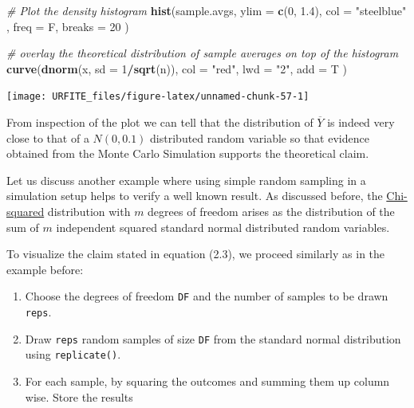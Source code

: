\documentclass[]{book}
\newenvironment{Shaded}{\begin{snugshade}}{\end{snugshade}}
\newcommand{\KeywordTok}[1]{\textcolor[rgb]{0.13,0.29,0.53}{\textbf{#1}}}
\newcommand{\DataTypeTok}[1]{\textcolor[rgb]{0.13,0.29,0.53}{#1}}
\newcommand{\DecValTok}[1]{\textcolor[rgb]{0.00,0.00,0.81}{#1}}
\newcommand{\FloatTok}[1]{\textcolor[rgb]{0.00,0.00,0.81}{#1}}
\newcommand{\StringTok}[1]{\textcolor[rgb]{0.31,0.60,0.02}{#1}}
\newcommand{\CommentTok}[1]{\textcolor[rgb]{0.56,0.35,0.01}{\textit{#1}}}
\newcommand{\OperatorTok}[1]{\textcolor[rgb]{0.81,0.36,0.00}{\textbf{#1}}}
\newcommand{\NormalTok}[1]{#1}
\providecommand{\tightlist}{%
  \setlength{\itemsep}{0pt}\setlength{\parskip}{0pt}}
\theoremstyle{definition}
\theoremstyle{definition}
\theoremstyle{definition}
\theoremstyle{remark}
\begin{document}
\begin{Shaded}
\begin{Highlighting}[]
\CommentTok{# Plot the density histogram}
\KeywordTok{hist}\NormalTok{(sample.avgs, }
     \DataTypeTok{ylim =} \KeywordTok{c}\NormalTok{(}\DecValTok{0}\NormalTok{, }\FloatTok{1.4}\NormalTok{), }
     \DataTypeTok{col =} \StringTok{"steelblue"}\NormalTok{ , }
     \DataTypeTok{freq =}\NormalTok{ F, }
     \DataTypeTok{breaks =} \DecValTok{20}
\NormalTok{     )}

\CommentTok{# overlay the theoretical distribution of sample averages on top of the histogram}
\KeywordTok{curve}\NormalTok{(}\KeywordTok{dnorm}\NormalTok{(x, }\DataTypeTok{sd =} \DecValTok{1}\OperatorTok{/}\KeywordTok{sqrt}\NormalTok{(n)), }
      \DataTypeTok{col =} \StringTok{"red"}\NormalTok{, }
      \DataTypeTok{lwd =} \StringTok{"2"}\NormalTok{, }
      \DataTypeTok{add =}\NormalTok{ T}
\NormalTok{      )}
\end{Highlighting}
\end{Shaded}

\begin{center}\texttt{[image: URFITE\_files/figure-latex/unnamed-chunk-57-1]} \end{center}

From inspection of the plot we can tell that the distribution of
\(\overline{Y}\) is indeed very close to that of a \(N(0, 0.1)\)
distributed random variable so that evidence obtained from the Monte
Carlo Simulation supports the theoretical claim.

Let us discuss another example where using simple random sampling in a
simulation setup helps to verify a well known result. As discussed
before, the \protect\hyperlink{chisquare}{Chi-squared} distribution with
\(m\) degrees of freedom arises as the distribution of the sum of \(m\)
independent squared standard normal distributed random variables.

To visualize the claim stated in equation (2.3), we proceed similarly as
in the example before:

\begin{enumerate}
\def\labelenumi{\arabic{enumi}.}
\tightlist
\item
  Choose the degrees of freedom \texttt{DF} and the number of samples to
  be drawn \texttt{reps}.
\item
  Draw \texttt{reps} random samples of size \texttt{DF} from the
  standard normal distribution using \texttt{replicate()}.
\item
  For each sample, by squaring the outcomes and summing them up column
  wise. Store the results
\end{enumerate}
\end{document}
